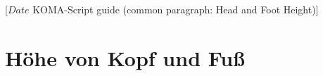 %
%
%
%
%
%
%
%
% 
%
%
%
%

                 [$Date$
                  KOMA-Script guide (common paragraph: Head and Foot Height)]




\section{Höhe von Kopf und Fuß}

